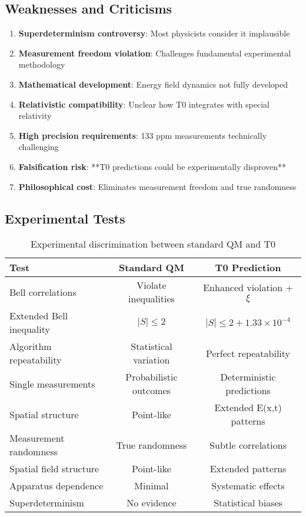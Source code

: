 \documentclass[12pt,a4paper]{article}
\newcommand{\xipar}{\xi}
\begin{document}
	\subsection{Weaknesses and Criticisms}
	
	\begin{enumerate}
		\item \textbf{Superdeterminism controversy}: Most physicists consider it implausible
		\item \textbf{Measurement freedom violation}: Challenges fundamental experimental methodology
		\item \textbf{Mathematical development}: Energy field dynamics not fully developed
		\item \textbf{Relativistic compatibility}: Unclear how T0 integrates with special relativity
		\item \textbf{High precision requirements}: 133 ppm measurements technically challenging
		\item \textbf{Falsification risk}: **T0 predictions could be experimentally disproven**
		\item \textbf{Philosophical cost}: Eliminates measurement freedom and true randomness
	\end{enumerate}
	
	\subsection{Experimental Tests}
	
	\begin{table}[htbp]
		\centering
		\begin{tabular}{lcc}
			\toprule
			\textbf{Test} & \textbf{Standard QM} & \textbf{T0 Prediction} \\
			\midrule
			Bell correlations & Violate inequalities & Enhanced violation + $\xipar$ \\
			Extended Bell inequality & $|S| \leq 2$ & $|S| \leq 2 + 1.33 \times 10^{-4}$ \\
			Algorithm repeatability & Statistical variation & Perfect repeatability \\
			Single measurements & Probabilistic outcomes & Deterministic predictions \\
			Spatial structure & Point-like & Extended E(x,t) patterns \\
			Measurement randomness & True randomness & Subtle correlations \\
			Spatial field structure & Point-like & Extended patterns \\
			Apparatus dependence & Minimal & Systematic effects \\
			Superdeterminism & No evidence & Statistical biases \\
			\bottomrule
		\end{tabular}
		\caption{Experimental discrimination between standard QM and T0}
	\end{table}
	
\end{document}
